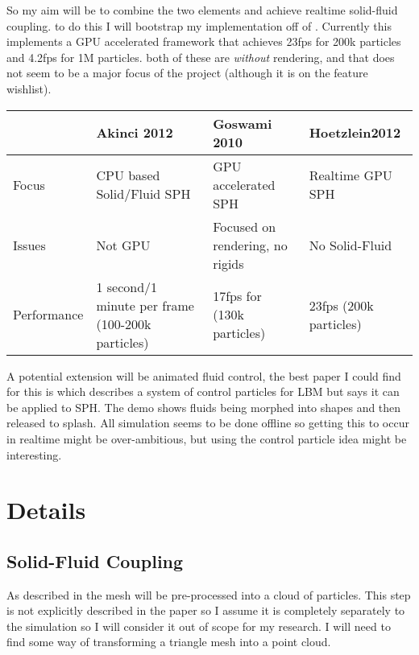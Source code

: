 \documentclass[10pt,a4paper,draft]{article}
\begin{document}
So my aim will be to combine the two elements and achieve realtime solid-fluid coupling. to do this I will bootstrap my implementation off of \cite{Hoetzlein2012}. Currently this implements a GPU accelerated framework that achieves 23fps for 200k particles and 4.2fps for 1M particles. both of these are \textit{without} rendering, and that does not seem to be a major focus of the project (although it is on the feature wishlist).

\begin{center}
   \begin{tabulary}{1.0\textwidth}{L||L|L|L}
		           & Akinci 2012               & Goswami 2010                    & Hoetzlein2012    \\ \hline \rule[-2ex]{0pt}{5.5ex}
		Focus     & CPU based Solid/Fluid SPH & GPU accelerated SPH             & Realtime GPU SPH \\ 
		Issues    & Not GPU                   & Focused on rendering, no rigids & No Solid-Fluid   \\ 
		
		Performance  & 1 second/1 minute per frame (100-200k particles)  & 17fps for (130k particles) & 23fps (200k particles) \\ 
		
   \end{tabulary}  
\end{center}

A potential extension will be animated fluid control, the best paper I could find for this is \cite{Thuerey2009} which describes a system of control particles for LBM but says it can be applied to SPH. The demo \cite{MagicFluid} shows fluids being morphed into shapes and then released to splash. All simulation seems to be done offline so getting this to occur in realtime might be over-ambitious, but using the control particle idea might be interesting.

\section{Details} 

 \subsection{Solid-Fluid Coupling}
As described in \cite{Akinci2012} the mesh will be pre-processed into a cloud of particles. This step is not explicitly described in the paper so I assume it is completely separately to the simulation so I will consider it out of scope for my research. I will need to find some way of transforming a triangle mesh into a point cloud.\newline
\end{document}
